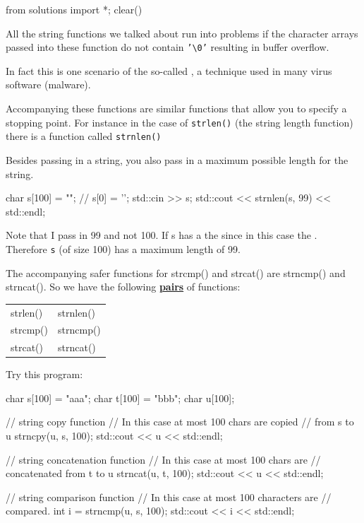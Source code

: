 \begin{python0}
from solutions import *; clear()
\end{python0}

All the string functions we talked about run into problems if the character arrays passed into these function do not contain \texttt{'\textbackslash 0'} resulting in buffer overflow.

In fact this is one scenario of the so-called , a technique used in many virus software (malware).

Accompanying these functions are similar functions that allow you to specify a stopping point. For instance in the case of \verb!strlen()! (the string length function) there is a function called \verb!strnlen()!

Besides passing in a string, you also pass in a maximum possible length
for the string.

\begin{consolethree}[escapeinside=||]
char s[100] = ""; // s[0] = '\0';
std::cin >> s;
std::cout << strnlen(s, 99) << std::endl;
\end{consolethree}

Note that I pass in 99 and not 100. If s has a  the  since in this case the . Therefore \texttt{s} (of size 100) has a maximum length of 99.


The accompanying safer functions for strcmp() and strcat() are strncmp() and strncat(). So we have the following \textbf{\underline{pairs}} of functions:

\begin{tabular}{ll}
strlen() & strnlen() \\
strcmp() & strncmp() \\
strcat() & strncat() \\
\end{tabular}

Try this program:

\begin{consolethree}[escapeinside=||]
char s[100] = "aaa";
char t[100] = "bbb";
char u[100];

// string copy function
// In this case at most 100 chars are copied
// from s to u
strncpy(u, s, 100);
std::cout << u << std::endl;

// string concatenation function
// In this case at most 100 chars are
// concatenated from t to u
strncat(u, t, 100);
std::cout << u << std::endl;

// string comparison function
// In this case at most 100 characters are
// compared.
int i = strncmp(u, s, 100);
std::cout << i << std::endl;
\end{consolethree}

